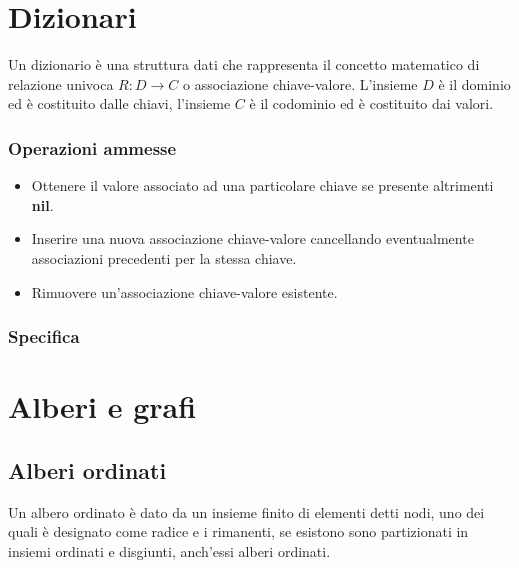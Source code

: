 \section{Dizionari}
Un dizionario \`e una struttura dati che rappresenta il concetto matematico di relazione univoca $R:D\rightarrow C$ o associazione chiave-valore. L'insieme
$D$ \`e il dominio ed \`e costituito dalle chiavi, l'insieme $C$ \`e il codominio ed \`e costituito dai valori.
\subsubsection{Operazioni ammesse}
\begin{itemize}
\item Ottenere il valore associato ad una particolare chiave se presente altrimenti \textbf{nil}.
\item Inserire una nuova associazione chiave-valore cancellando eventualmente associazioni precedenti per la stessa chiave.
\item Rimuovere un'associazione chiave-valore esistente.
\end{itemize}
\subsubsection{Specifica}
\begin{algorithm}
\DontPrintSemicolon
{}

\caption{\protect\Dictionary}

\Item {}\;
\;
\;
\end{algorithm}
\section{Alberi e grafi}
\subsection{Alberi ordinati}
Un albero ordinato \`e dato da un insieme finito di elementi detti nodi, uno dei quali \`e designato come radice e i rimanenti, se esistono sono 
partizionati in insiemi ordinati e disgiunti, anch'essi alberi ordinati.
